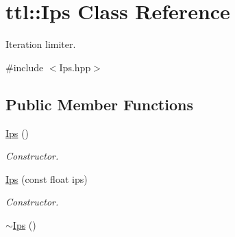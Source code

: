\hypertarget{classttl_1_1_ips}{\section{ttl\-:\-:Ips Class Reference}
\label{classttl_1_1_ips}
}


Iteration limiter.  




{\ttfamily \#include $<$Ips.\-hpp$>$}

\subsection*{Public Member Functions}
\begin{DoxyCompactItemize}
\item 
\hyperlink{classttl_1_1_ips_ad34a447aea255afcf7f410a5af3a1a82}{Ips} ()
\begin{DoxyCompactList}\small\item\em Constructor. \end{DoxyCompactList}\item 
\hyperlink{classttl_1_1_ips_a4977869885cf57fcfbfa006507be9805}{Ips} (const float ips)
\begin{DoxyCompactList}\small\item\em Constructor. \end{DoxyCompactList}\item 
\hypertarget{classttl_1_1_ips_aa10947317c4de26ef17d7671f0451f51}{\hyperlink{classttl_1_1_ips_aa10947317c4de26ef17d7671f0451f51}{$\sim$\-Ips} ()}\label{classttl_1_1_ips_aa10947317c4de26ef17d7671f0451f51}


\end{DoxyCompactItemize}
